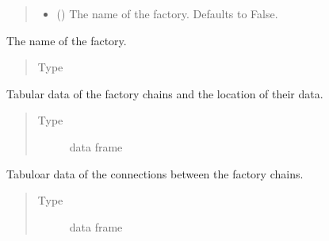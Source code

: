 \documentclass[a4paper,10pt,english]{sphinxmanual}
\begin{document}
\begin{fulllineitems}
\begin{quote}
\begin{description}
\begin{itemize}
\item {} 
 (\sphinxstyleliteralemphasis{\sphinxupquote{, }}) \textendash{} The name of the factory. Defaults to False.

\end{itemize}

\end{description}\end{quote}

\begin{fulllineitems}
\label{\detokenize{factory:factory.Factory.name}}
The name of the factory.
\begin{quote}\begin{description}
\item[{Type}] \leavevmode
{}

\end{description}\end{quote}

\end{fulllineitems}


\begin{fulllineitems}
\label{\detokenize{factory:factory.Factory.chains_df}}
Tabular data of the factory chains and the
location of their data.
\begin{quote}\begin{description}
\item[{Type}] \leavevmode
data frame

\end{description}\end{quote}

\end{fulllineitems}


\begin{fulllineitems}
\label{\detokenize{factory:factory.Factory.connections_df}}
Tabuloar data of the connections
between the factory chains.
\begin{quote}\begin{description}
\item[{Type}] \leavevmode
data frame


\end{description}
\end{quote}
\end{fulllineitems}
\end{fulllineitems}
\end{document}
